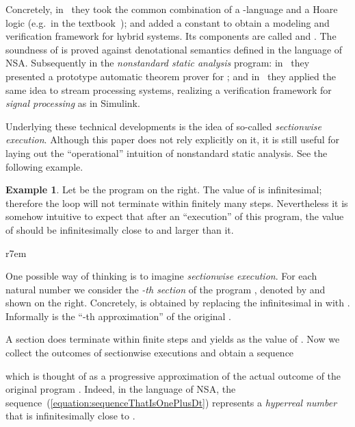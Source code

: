 \documentclass[envcountsect,orivec]{llncs} \pdfoutput=1
\theoremstyle{definition}
\newtheorem{myexpl}[mythm]{Example}
\begin{document}
Concretely, in~\cite{Suenaga2011} they took the common combination of a
-language and a Hoare
logic (e.g.\ in the textbook~\cite{Winskel1993}); and added a constant 
to obtain a modeling and verification framework for hybrid systems.  Its
 components are called  and . 
The soundness of  is proved
against denotational semantics defined in the language
of NSA.
Subsequently in the \emph{nonstandard static analysis} program: in~\cite{Hasuo2012} they presented a prototype
automatic theorem prover for ;
and in~\cite{Suenaga2013} 
they applied the same idea to stream processing systems, realizing 
a verification framework for \emph{signal processing} as in Simulink.

  Underlying these technical developments is the idea of so-called \emph{sectionwise execution}.
Although this paper does not rely explicitly on it, it is still useful
for laying out the ``operational'' intuition of nonstandard static analysis.
See the following example.
\vspace*{1em}

\noindent
\begin{minipage}{.77\textwidth}
\begin{myexpl}\label{example:elapsedTime}
  Let  be the 
 program on the right.
The value of  is infinitesimal; therefore the
  loop will not terminate within finitely many steps.
 Nevertheless it is somehow intuitive to expect that after an ``execution'' of
 this program, the value of 
 should be infinitesimally close to  and larger than it.  
\end{myexpl}
\end{minipage}
\hfill




\begin{wrapfigure}{r}{7em}

\end{wrapfigure}

 One possible way of thinking is to imagine \emph{sectionwise execution}.  For each
 natural number  we consider the \emph{-th section} of the program
 , denoted by 
 and shown on the right.
 Concretely,  is obtained by replacing the
 infinitesimal  in  with .
Informally  is the ``-th approximation'' of
 the original .

 A section  does terminate within
 finite steps and
 yields  as the value of .
 Now we collect the outcomes of sectionwise executions and obtain
 a sequence 
 
 which is thought of as a progressive approximation of the actual
 outcome of the original program .  Indeed, in the
 language of  NSA, the  sequence~(\ref{equation:sequenceThatIsOnePlusDt}) represents a \emph{hyperreal number}
  that is infinitesimally close to . 
\end{document}
